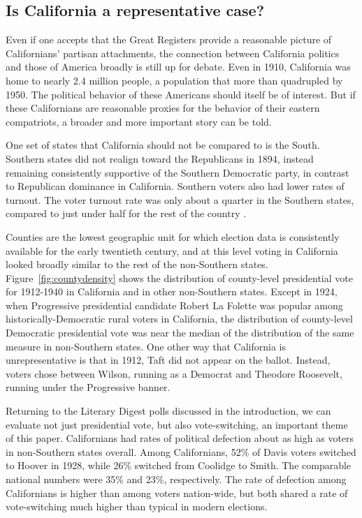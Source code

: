 \documentclass[11pt]{scrartcl}\usepackage[]{graphicx}\usepackage[]{color}
\begin{document}
\FloatBarrier
\subsection*{Is California a representative case?}

Even if one accepts that the Great Registers provide a reasonable picture of Californians' partisan attachments, the connection between California politics and those of America broadly is still up for debate. Even in 1910, California was home to nearly 2.4 million people, a population that more than quadrupled by 1950. The political behavior of these Americans should itself be of interest.  But if these Californians are reasonable proxies for the behavior of their eastern compatriots, a broader and more important story can be told.  

One set of states that California should not be compared to is the South. Southern states did not realign toward the Republicans in 1894, instead remaining consistently supportive of the Southern Democratic party, in contrast to Republican dominance in California. Southern voters also had lower rates of turnout. The voter turnout rate was only about a quarter in the Southern states, compared to just under half for the rest of the country \citep{burnham1965changing}.

Counties are the lowest geographic unit for which election data is consistently available for the early twentieth century, and at this level voting in California looked broadly similar to the rest of the non-Southern states.  Figure~\ref{fig:countydensity} shows the distribution of county-level presidential vote for 1912-1940 in California and in other non-Southern states. Except in 1924, when Progressive presidential candidate Robert La Folette was popular among historically-Democratic rural voters in California, the distribution of county-level Democratic presidential vote was near the median of the distribution of the same measure in non-Southern states. One other way that California is unrepresentative is that in 1912, Taft did not appear on the ballot. Instead, voters chose between Wilson, running as a Democrat and Theodore Roosevelt, running under the Progressive banner.

Returning to the Literary Digest polls discussed in the introduction, we can evaluate not just presidential vote, but also vote-switching, an important theme of this paper. Californians had rates of political defection about as high as voters in non-Southern states overall. Among Californians, 52\% of Davis voters switched to Hoover in 1928, while 26\% switched from Coolidge to Smith.  The comparable national numbers were 35\% and 23\%, respectively. The rate of defection among Californians is higher than among voters nation-wide, but both shared a rate of vote-switching much higher than typical in modern elections.
\end{document}

